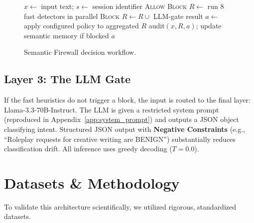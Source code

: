 \documentclass[conference]{IEEEtran}
\begin{document}
\begin{figure}[htbp]
\begin{algorithmic}[1]
\STATE $x \leftarrow$ input text; $s \leftarrow$ session identifier
    \RETURN \textsc{Allow}
\ENDIF
{}
    \RETURN \textsc{Block}
\ENDIF
\STATE $R \leftarrow$ run 8 fast detectors in parallel
    \RETURN \textsc{Block} 
\ENDIF
{}
    \STATE $R \leftarrow R \cup$ LLM-gate result
\ENDIF
\STATE $a \leftarrow$ apply configured policy to aggregated $R$
\STATE audit$(x, R, a)$; update semantic memory if blocked
\RETURN $a$
\end{algorithmic}
\caption{Semantic Firewall decision workflow.}
\label{alg:workflow}
\end{figure}

\subsection{Layer 3: The LLM Gate}
If the fast heuristics do not trigger a block, the input is routed to the final layer: Llama-3.3-70B-Instruct. The LLM is given a restricted system prompt (reproduced in Appendix~\ref{app:system_prompt}) and outputs a JSON object classifying intent. Structured JSON output with \textbf{Negative Constraints} (e.g., ``Roleplay requests for creative writing are BENIGN'') substantially reduces classification drift. All inference uses greedy decoding ($T{=}0.0$).

\section{Datasets \& Methodology}

To validate this architecture scientifically, we utilized rigorous, standardized datasets.
\end{document}
